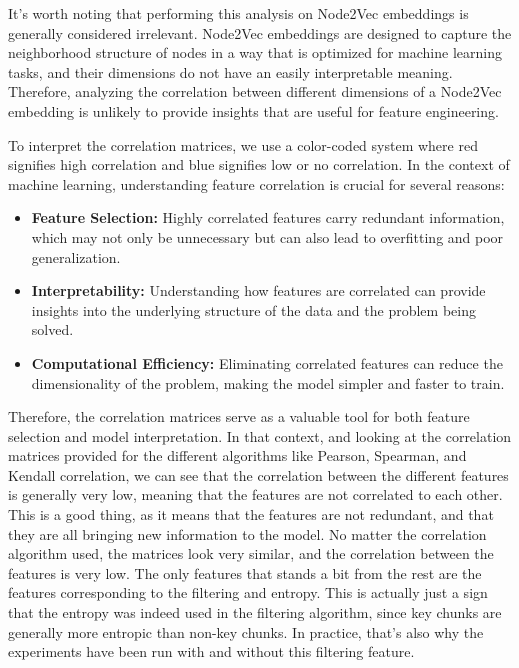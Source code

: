 It's worth noting that performing this analysis on Node2Vec embeddings is generally considered irrelevant. Node2Vec embeddings are designed to capture the neighborhood structure of nodes in a way that is optimized for machine learning tasks, and their dimensions do not have an easily interpretable meaning. Therefore, analyzing the correlation between different dimensions of a Node2Vec embedding is unlikely to provide insights that are useful for feature engineering.

To interpret the correlation matrices, we use a color-coded system where red signifies high correlation and blue signifies low or no correlation. In the context of machine learning, understanding feature correlation is crucial for several reasons:

\begin{itemize}
    \item \textbf{Feature Selection:} Highly correlated features carry redundant information, which may not only be unnecessary but can also lead to overfitting and poor generalization.
    \item \textbf{Interpretability:} Understanding how features are correlated can provide insights into the underlying structure of the data and the problem being solved.
    \item \textbf{Computational Efficiency:} Eliminating correlated features can reduce the dimensionality of the problem, making the model simpler and faster to train.
\end{itemize}

Therefore, the correlation matrices serve as a valuable tool for both feature selection and model interpretation. In that context, and looking at the correlation matrices provided for the different algorithms like Pearson, Spearman, and Kendall correlation, we can see that the correlation between the different features is generally very low, meaning that the features are not correlated to each other. This is a good thing, as it means that the features are not redundant, and that they are all bringing new information to the model. No matter the correlation algorithm used, the matrices look very similar, and the correlation between the features is very low. The only features that stands a bit from the rest are the features corresponding to the filtering and entropy. This is actually just a sign that the entropy was indeed used in the filtering algorithm, since key chunks are generally more entropic than non-key chunks. In practice, that's also why the experiments have been run with and without this filtering feature.

